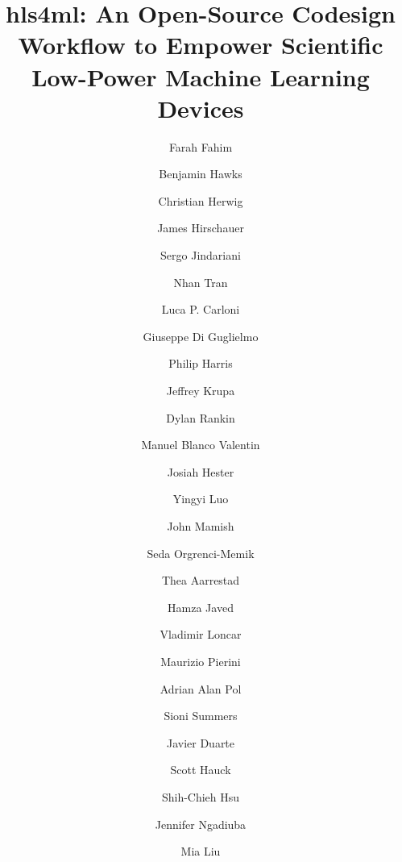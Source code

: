\documentclass[tinyml]{acmart}
\begin{document}
\title{hls4ml: An Open-Source Codesign Workflow to Empower Scientific Low-Power Machine Learning Devices}


\author{Farah Fahim}
\author{Benjamin Hawks}
 \author{Christian Herwig}
 \author{James Hirschauer}
 \author{Sergo Jindariani}
 \author{Nhan Tran}
 \authornotemark[1]

 \author{Luca P. Carloni}
 \author{Giuseppe Di Guglielmo}

 \author{Philip Harris}
 \author{Jeffrey Krupa}
 \author{Dylan Rankin}

 \author{Manuel Blanco Valentin}
 \author{Josiah Hester}
 \author{Yingyi Luo}
 \author{John Mamish}
 \author{Seda Orgrenci-Memik}

 \author{Thea Aarrestad}
 \author{Hamza Javed}
 \author{Vladimir Loncar}
 \author{Maurizio Pierini}
 \author{Adrian Alan Pol}
 \author{Sioni Summers}

 \author{Javier Duarte}

 \author{Scott Hauck}
 \author{Shih-Chieh Hsu}

 \author{Jennifer Ngadiuba}

\author{Mia Liu}
\end{document}
